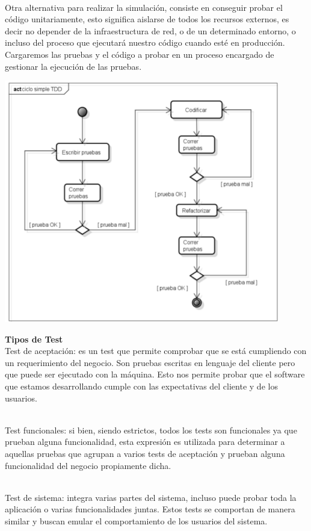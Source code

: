 \begin{flushleft}
\begin{itemize}
\textbf{}\\
Otra alternativa para realizar la simulación, consiste en conseguir probar el código unitariamente, esto significa aislarse de todos los recursos externos, es decir no depender de la infraestructura de red, o de un determinado entorno, o incluso del proceso que ejecutará nuestro código cuando esté en producción. Cargaremos las pruebas y el código a probar en un proceso encargado de gestionar la ejecución de las pruebas.
\begin{center}
    \includegraphics[width=12cm]{./Imagenes/TDD}
    \end{center}
\textbf{Tipos de Test}
\textbf{}\\
Test de aceptación: es un test que permite comprobar que se está cumpliendo con un requerimiento del negocio. Son pruebas escritas en lenguaje del cliente pero que puede ser ejecutado con la máquina. Esto nos permite probar que el software que estamos desarrollando cumple con las expectativas del cliente y de los usuarios.

\textbf{}\\
Test funcionales: si bien, siendo estrictos, todos los tests son funcionales ya que prueban alguna funcionalidad, esta expresión es utilizada para determinar a aquellas pruebas que agrupan a varios tests de aceptación y prueban alguna funcionalidad del negocio propiamente dicha.

\textbf{}\\
Test de sistema: integra varias partes del sistema, incluso puede probar toda la aplicación o varias funcionalidades juntas. Estos tests se comportan de manera similar y buscan emular el comportamiento de los usuarios del sistema.


\end{itemize}
\end{flushleft}
